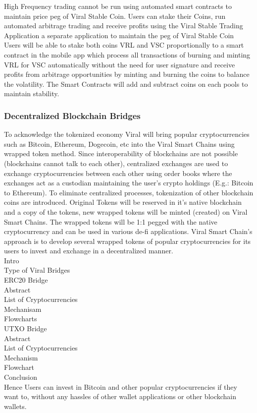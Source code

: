 \documentclass[10pt]{article}
\begin{document}
High Frequency trading cannot be run using automated smart contracts to maintain price peg of Viral Stable Coin. Users can stake their Coins, run automated arbitrage trading and receive profits using the Viral Stable Trading Application a separate application to maintain the peg of Viral Stable Coin\\

Users will be able to stake both coins VRL and VSC proportionally to a smart contract in the mobile app which process all transactions of burning and minting VRL for VSC automatically without the need for user signature and receive profits from arbitrage opportunities by minting and burning the coins to balance the volatility. The Smart Contracts will add and subtract coins on each pools to maintain stability.\\

\subsubsection{Decentralized Blockchain Bridges}

To acknowledge the tokenized economy Viral will bring popular cryptocurrencies such as Bitcoin, Ethereum, Dogecoin, etc into the Viral Smart Chains using wrapped token method. Since interoperability of blockchains are not possible (blockchains cannot talk to each other), centralized exchanges are used to exchange cryptocurrencies between each other using order books where the exchanges act as a custodian maintaining the user’s crypto holdings (E.g.: Bitcoin to Ethereum). To eliminate centralized processes, tokenization of other blockchain coins are introduced. Original Tokens will be reserved in it's native blockchain and a copy of the tokens, new wrapped tokens will be minted (created) on Viral Smart Chains. The wrapped tokens will be 1:1 pegged with the native cryptocurrency and can be used in various de-fi applications. Viral Smart Chain's approach is to develop several wrapped tokens of popular cryptocurrencies for its users to invest and exchange in a decentralized manner.\\

Intro\\
Type of Viral Bridges\\
ERC20 Bridge\\
Abstract\\
List of Cryptocurrencies\\
Mechanisam\\
Flowcharts\\
UTXO Bridge\\
Abstract\\
List of Cryptocurrencies\\
Mechanism\\
Flowchart\\
Conclusion\\
Hence Users can invest in Bitcoin and other popular cryptocurrencies if they want to, without any hassles of other wallet applications or other blockchain wallets.
\end{document}
